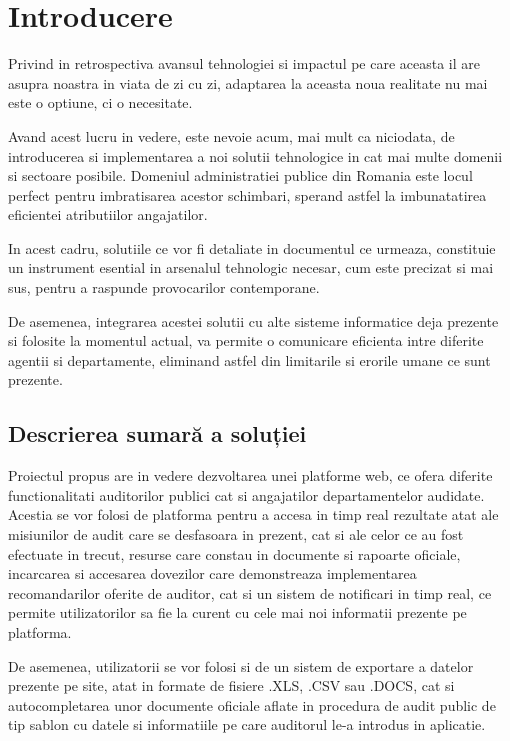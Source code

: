 \chapter*{Introducere} 
Privind in retrospectiva avansul tehnologiei si impactul pe care aceasta il are asupra noastra in viata de zi cu zi, adaptarea la aceasta noua realitate nu mai este o optiune, ci o necesitate.
\par Avand acest lucru in vedere, este nevoie acum, mai mult ca niciodata, de introducerea si implementarea a noi solutii tehnologice in cat mai multe domenii si sectoare posibile. Domeniul administratiei publice din Romania este locul perfect pentru imbratisarea acestor schimbari, sperand astfel la imbunatatirea eficientei atributiilor angajatilor.
\par In acest cadru, solutiile ce vor fi detaliate in documentul ce urmeaza, constituie un instrument esential 
in arsenalul tehnologic necesar, cum este precizat si mai sus, pentru a raspunde provocarilor contemporane.
\par De asemenea, integrarea acestei solutii cu alte sisteme informatice deja prezente si folosite la momentul actual, va permite o comunicare eficienta intre diferite agentii si departamente, eliminand astfel din limitarile si erorile umane ce sunt prezente.
\section*{Descrierea sumară a soluției}
Proiectul propus are in vedere dezvoltarea unei platforme web, ce ofera diferite functionalitati auditorilor publici cat si angajatilor departamentelor audidate. Acestia se vor folosi de platforma pentru a accesa in timp real rezultate atat ale misiunilor de audit care se desfasoara in prezent, cat si ale celor ce au fost efectuate in trecut, resurse care constau in documente si rapoarte oficiale, 
incarcarea si accesarea dovezilor care demonstreaza implementarea recomandarilor oferite de auditor, cat si un sistem de notificari in timp real, ce permite utilizatorilor sa fie la curent cu cele mai noi informatii prezente pe platforma.
\par De asemenea, utilizatorii se vor folosi si de un sistem de exportare a datelor prezente pe site, atat in formate de fisiere .XLS, .CSV sau .DOCS, cat si autocompletarea unor documente oficiale aflate in procedura de audit public de tip sablon cu datele si informatiile pe care auditorul le-a introdus in aplicatie.
